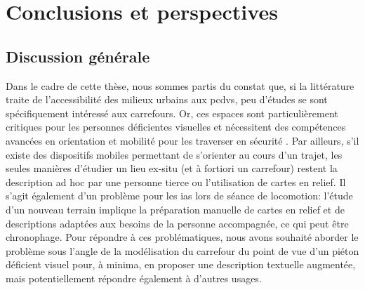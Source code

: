\chapter{Conclusions et perspectives}
\label{chap:conclusion}



\section{Discussion générale}

Dans le cadre de cette thèse, nous sommes partis du constat que, si la littérature traite de l'accessibilité des milieux urbains aux \glspl{pcdv}, peu d'études se sont spécifiquement intéressé aux carrefours. Or, ces espaces sont particulièrement critiques pour les personnes déficientes visuelles et nécessitent des compétences avancées en orientation et mobilité pour les traverser en sécurité \cite{ratelle_manuel_2019}. Par ailleurs, s'il existe des dispositifs mobiles permettant de s'orienter au cours d'un trajet, les seules manières d'étudier un lieu ex-situ (et à fortiori un carrefour) restent la description ad hoc par une personne tierce ou l'utilisation de cartes en relief. Il s'agit également d'un problème pour les \glspl{ia} lors de séance de locomotion: l'étude d'un nouveau terrain implique la préparation manuelle de cartes en relief et de descriptions adaptées aux besoins de la personne accompagnée, ce qui peut être chronophage. Pour répondre à ces problématiques, nous avons souhaité aborder le problème sous l'angle de la modélisation du carrefour du point de vue d'un piéton déficient visuel pour, à minima, en proposer une description textuelle augmentée, mais potentiellement répondre également à d'autres usages.

